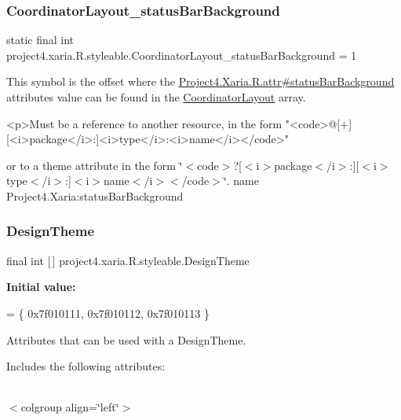 \subsubsection{\texorpdfstring{Coordinator\+Layout\+\_\+status\+Bar\+Background}{CoordinatorLayout\_statusBarBackground}}
{\footnotesize\ttfamily static final int project4.\+xaria.\+R.\+styleable.\+Coordinator\+Layout\+\_\+status\+Bar\+Background = 1\hspace{0.3cm}{\ttfamily [static]}}

This symbol is the offset where the \hyperlink{}{Project4.\+Xaria.\+R.\+attr\#status\+Bar\+Background} attribute\textquotesingle{}s value can be found in the \hyperlink{classproject4_1_1xaria_1_1R_1_1styleable_abe1865e41984c448731db5ef335746e0}{Coordinator\+Layout} array.

\begin{DoxyVerb}      <p>Must be a reference to another resource, in the form "<code>@[+][<i>package</i>:]<i>type</i>:<i>name</i></code>"
\end{DoxyVerb}
 or to a theme attribute in the form \char`\"{}$<$code$>$?\mbox{[}$<$i$>$package$<$/i$>$\+:\mbox{]}\mbox{[}$<$i$>$type$<$/i$>$\+:\mbox{]}$<$i$>$name$<$/i$>$$<$/code$>$\char`\"{}.  name Project4.\+Xaria\+:status\+Bar\+Background \mbox{\label{classproject4_1_1xaria_1_1R_1_1styleable_a190554b7e28f27d85d823a1301dd3cf5}} 
\subsubsection{\texorpdfstring{Design\+Theme}{DesignTheme}}
{\footnotesize\ttfamily final int \mbox{[}$\,$\mbox{]} project4.\+xaria.\+R.\+styleable.\+Design\+Theme\hspace{0.3cm}{\ttfamily [static]}}

{\bfseries Initial value\+:}
\begin{DoxyCode}
= \{
            0x7f010111, 0x7f010112, 0x7f010113
        \}
\end{DoxyCode}
Attributes that can be used with a Design\+Theme. 

Includes the following attributes\+:

\tabulinesep=1mm
\begin{longtabu} spread 0pt [c]{*{0}{|X[-1]}|}
\hline
\end{longtabu}
$<$colgroup align=\char`\"{}left\char`\"{}$>$ 

